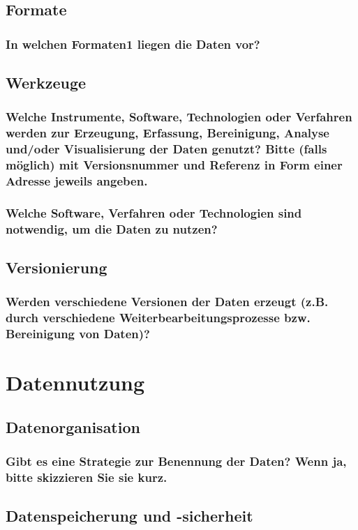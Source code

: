 \subsection*{Formate}
\subsubsection*{In welchen Formaten1 liegen die Daten vor?}
\subsection*{Werkzeuge}
\subsubsection*{Welche Instrumente, Software, Technologien oder Verfahren werden zur Erzeugung, Erfassung, Bereinigung, Analyse und/oder Visualisierung der Daten genutzt? Bitte (falls möglich) mit Versionsnummer und Referenz in Form einer Adresse jeweils angeben.}
\subsubsection*{Welche Software, Verfahren oder Technologien sind notwendig, um die Daten zu nutzen?}
\subsection*{Versionierung}
\subsubsection*{Werden verschiedene Versionen der Daten erzeugt (z.B. durch verschiedene Weiterbearbeitungsprozesse bzw. Bereinigung von Daten)?}

\section{Datennutzung}
\subsection*{Datenorganisation}
\subsubsection*{Gibt es eine Strategie zur Benennung der Daten? Wenn ja, bitte skizzieren Sie sie kurz.}
\subsection*{Datenspeicherung und -sicherheit}

